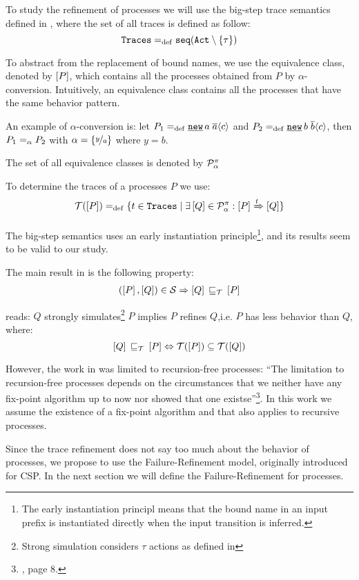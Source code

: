 To study the refinement of \picalc{} processes we will use the big-step trace semantics defined in \cite{gieseking}, where the set of all traces is defined as follow:
\[\tr \define \seqset{\actions\setminus\set{\tau}}\]

To abstract from the replacement of bound names, we use the equivalence class, denoted by $\left[P\right]$, which contains all the processes obtained from $P$ by $\alpha$-conversion. Intuitively, an equivalence class contains all the processes that have the same behavior pattern.

An example of $\alpha$-conversion is: let $P_1\define\procres{a}{\out{a}{c}}$ and $P_2\define\procres{b}{\out{b}{c}}$, then $P_1 =_\alpha{} P_2$ with $\alpha = \left\{\nicefrac{y}{a}\right\}$ where $y = b$.

The set of all equivalence classes is denoted by $\mathcal P^{\pi}_\alpha$ 

To determine the traces of a processes $P$ we use:
\begin{align}
    \traces[P] \define \{t\in \tr \mid \exists \ec{Q}\in\procsApha: \ec{P} \bigstep{t} \ec{Q}\}
\label{determine_trace}
\end{align}

The big-step semantics uses an early instantiation principle\footnote{The early instantiation principl means that the bound name in an input prefix is instantiated directly when the input transition is inferred.}, and its results seem to be valid to our study.

The main result in \cite{gieseking} is the following property:
\begin{align}
    (\ec{P},\ec{Q})\in{}\simu \Rightarrow \ec{Q} \refi \ec{P} \label{property1}
\end{align}

 reads: $Q$ strongly simulates\footnote{Strong simulation considers $\tau$ actions as defined in } $P$ implies $P$ refines $Q$,i.e. $P$ has less behavior than $Q$, where:
\[\ec{Q}\refi \ec{P} \Leftrightarrow \traces[P]\subseteq\traces[Q]\]

However, the work in \cite{gieseking} was limited to recursion-free processes: ``The limitation to recursion-free processes depends on the circumstances that we neither have any fix-point algorithm up to now nor showed that one existse''\footnote{\cite{gieseking}, page $8$.}. In this work we assume the existence of a fix-point algorithm and that  also applies to recursive processes.

Since the trace refinement does not say too much about the behavior of processes, we propose to use the Failure-Refinement model, originally introduced for CSP. In the next section we will define the Failure-Refinement for \picalc{} processes.